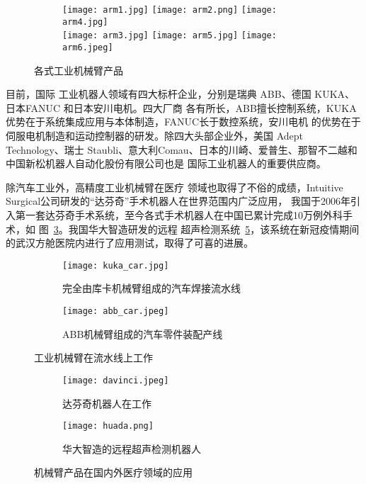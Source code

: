 \begin{figure}
\centering
\begin{subfigure}{1.\textwidth}
  \centering
  \texttt{[image: arm1.jpg]}
  \texttt{[image: arm2.png]}
  \texttt{[image: arm4.jpg]}\\
  \texttt{[image: arm3.jpg]}
  \texttt{[image: arm5.jpg]}
  \texttt{[image: arm6.jpeg]}
\end{subfigure}%
\caption{各式工业机械臂产品}
\label{fig:industry_arms}
\end{figure}


目前，国际
工业机器人领域有四大标杆企业，分别是瑞典 ABB、德国 KUKA、日本FANUC 和日本安川电机。四大厂商
各有所长，ABB擅长控制系统，KUKA优势在于系统集成应用与本体制造，FANUC长于数控系统，安川电机
的优势在于伺服电机制造和运动控制器的研发。除四大头部企业外，美国 Adept Technology、瑞士
Staubli、意大利Comau、日本的川崎、爱普生、那智不二越和中国新松机器人自动化股份有限公司也是
国际工业机器人的重要供应商\cite{huangxihuanReview}。

除汽车工业外，高精度工业机械臂在医疗
领域也取得了不俗的成绩，Intuitive Surgical公司研发的“达芬奇”手术机器人在世界范围内广泛应用，
我国于2006年引入第一套达芬奇手术系统，至今各式手术机器人在中国已累计完成10万例外科手术，如
图~\ref{fig:davinci}。我国华大智造研发的远程
超声检测系统~\ref{fig:huada}，该系统在新冠疫情期间的武汉方舱医院内进行了应用测试\cite{wushengzheng20205g}，取得了可喜的进展。


\begin{figure}
\centering
\begin{subfigure}{.5\textwidth}
  \centering
  \texttt{[image: kuka\_car.jpg]}
  \caption{完全由库卡机械臂组成的汽车焊接流水线}
\end{subfigure}%
\begin{subfigure}{.5\textwidth}
  \centering
  \texttt{[image: abb\_car.jpeg]}
  \caption{ABB机械臂组成的汽车零件装配产线}
\end{subfigure}
\caption{工业机械臂在流水线上工作}
\label{fig:armcar}
\end{figure}

\begin{figure}
\centering
\begin{subfigure}{.5\textwidth}
  \centering
  \texttt{[image: davinci.jpeg]}
  \caption{达芬奇机器人在工作}
  \label{fig:davinci}
\end{subfigure}%
\begin{subfigure}{.5\textwidth}
  \centering
  \texttt{[image: huada.png]}
  \caption{华大智造的远程超声检测机器人}
  \label{fig:huada}
\end{subfigure}%
\caption{机械臂产品在国内外医疗领域的应用}
\end{figure}



